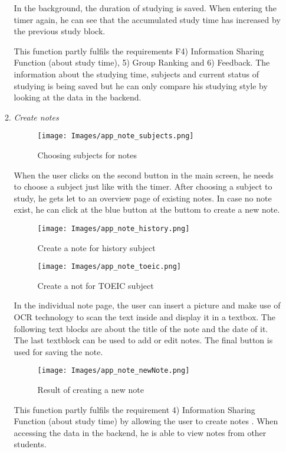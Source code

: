 \documentclass[conference]{IEEEtran}
\begin{document}
\begin{enumerate}
\begin{enumerate}
In the background, the duration of studying is saved. When entering the timer again, he can see that the accumulated study time has increased by the previous study block.

This function partly fulfils the requirements F4) Information Sharing Function (about study time), 5) Group Ranking and 6) Feedback. The information about the studying time, subjects and current status of studying is being saved but he can only compare his studying style by looking at the data in the backend.\\
    
    \item \textit{Create notes}
    
            \begin{figure}[htp]
    \centering
    \texttt{[image: Images/app\_note\_subjects.png]}
    \caption{Choosing subjects for notes}
\end{figure}

When the user clicks on the second button in the main screen, he needs to choose a subject just like with the timer. After choosing a subject to study, he gets let to an overview page of existing notes. In case no note exist, he can click at the blue button at the buttom to create a new note.

        \begin{figure}[htp]
    \centering
    \texttt{[image: Images/app\_note\_history.png]}
    \caption{Create a note for history subject}
\end{figure}

        \begin{figure}[htp]
    \centering
    \texttt{[image: Images/app\_note\_toeic.png]}
    \caption{Create a not for TOEIC subject}
\end{figure}

In the individual note page, the user can insert a picture and make use of OCR technology to scan the text inside and display it in a textbox. The following text blocks are about the title of the note and the date of it. The last textblock can be used to add or edit notes. The final button is used for saving the note. 


        \begin{figure}[htp]
    \centering
    \texttt{[image: Images/app\_note\_newNote.png]}
    \caption{Result of creating a new note}
\end{figure}

This function partly fulfils the requirement 4) Information Sharing Function (about study time) by allowing the user to create notes . When accessing the data in the backend, he is able to view notes from other students.\\
    

\end{enumerate}
\end{enumerate}
\end{document}
